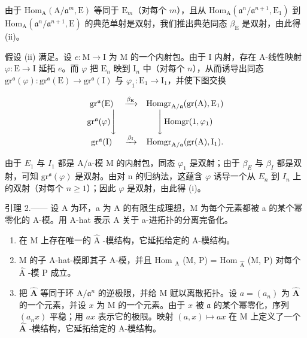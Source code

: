 由于 \(\mathrm{Hom}_{\mathrm{A}}(\mathrm{A}/\mathfrak{a}^{m},\mathrm{E})\) 等同于 \(\mathrm{E}_{m}\)（对每个 \(m\)），且从 \(\mathrm{Hom}_{\mathrm{A}}(\mathfrak{a}^{n}/\mathfrak{a}^{n+1},\mathrm{E}_{1})\) 到 \(\mathrm{Hom}_{\mathrm{A}}(\mathfrak{a}^{n}/\mathfrak{a}^{n+1},\mathrm{E})\) 的典范单射是双射，我们推出典范同态 \(\beta_{\mathrm{E}}\) 是双射，由此得 (ii)。

假设 (ii) 满足。设 \(e: \mathrm{M} \to \mathrm{I}\) 为 M 的一个内射包。由于 I 内射，存在 A-线性映射 \(\varphi: \mathrm{E} \to \mathrm{I}\) 延拓 \(e\)。而 \(\varphi\) 把 \(\mathrm{E}_n\) 映到 \(\mathrm{I}_n\) 中（对每个 \(n\)），从而诱导出同态 \(\mathrm{gr}^{\mathfrak{a}}(\varphi):\mathrm{gr}^{\mathfrak{a}}(\mathrm{E})\to \mathrm{gr}^{\mathfrak{a}}(\mathrm{I})\) 与 \(\varphi_{1}:\mathrm{E}_{1}\rightarrow \mathrm{I}_{1}\)，并使下图交换

\[
\begin{array}{c c c} \operatorname{gr} ^ {\mathfrak {a}} (\mathrm{E}) & \xrightarrow {\beta_ {\mathrm{E}}} & \operatorname{Homgr} _ {\mathrm{A} / \mathfrak {a}} (\operatorname{gr} (\mathrm{A}), \mathrm{E} _ {1}) \\ \operatorname{gr} ^ {\mathfrak {a}} (\varphi) \Bigg \downarrow & & \Bigg \downarrow \operatorname{Homgr} (1, \varphi_ {1}) \\ \operatorname{gr} ^ {\mathfrak {a}} (\mathrm{I}) & \xrightarrow {\beta_ {\mathrm{I}}} & \operatorname{Homgr} _ {\mathrm{A} / \mathfrak {a}} (\operatorname{gr} (\mathrm{A}), \mathrm{I} _ {1}). \end{array}
\]

由于 \(E_{1}\) 与 \(I_{1}\) 都是 A/a-模 M 的内射包，同态 \(\varphi_{1}\) 是双射；由于 \(\beta_{E}\) 与 \(\beta_{I}\) 都是双射，可知 \(\mathrm{gr}^{\mathfrak{a}}(\varphi)\) 是双射。由对 n 的归纳法，这蕴含 \(\varphi\) 诱导一个从 \(E_{n}\) 到 \(I_{n}\) 上的双射（对每个 \(n \geqslant 1\)）；因此 \(\varphi\) 是双射，由此得 (i)。

引理 2.—— 设 A 为环，a 为 A 的有限生成理想，M 为每个元素都被 a 的某个幂零化的 A-模。用 A-hat 表示 A 关于 a-进拓扑的分离完备化。

\begin{enumerate}
\def\labelenumi{\alph{enumi})}
\item
  在 M 上存在唯一的 \(\widehat{\mathrm{A}}\) -模结构，它延拓给定的 A-模结构。
\item
  M 的子 A-hat-模即其子 A-模，并且 Hom \(_{\text{A}}\) (M, P) = Hom \(_{\widehat{\text{A}}}\) (M, P) 对每个 \(\widehat{\text{A}}\) -模 P 成立。
\item
  把 \(\widehat{\mathbf{A}}\) 等同于环 \(\mathrm{A} / \mathfrak{a}^n\) 的逆极限，并给 M 赋以离散拓扑。设 \(a = (a_n)\) 为 \(\widehat{\mathbf{A}}\) 的一个元素，并设 \(x\) 为 M 的一个元素。由于 \(x\) 被 \(\mathfrak{a}\) 的某个幂零化，序列 \((a_n x)\) 平稳；用 \(ax\) 表示它的极限。映射 \((a, x) \mapsto ax\) 在 M 上定义了一个 \(\widehat{\mathbf{A}}\) -模结构，它延拓给定的 A-模结构。
\end{enumerate}

